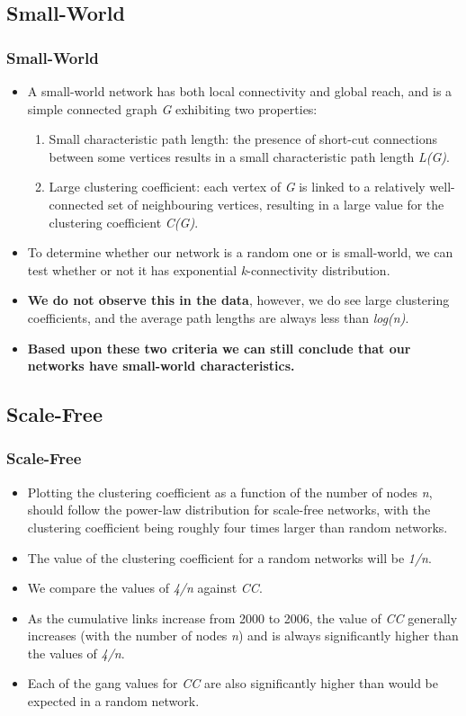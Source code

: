 \documentclass[pdftex]{beamer}
\begin{document}
\subsection{Small-World}

\begin{frame}
\frametitle{Small-World}
\begin{itemize}
\item A small-world network has both local connectivity and global reach, and is a simple connected graph {\emph{G}} exhibiting two properties:
\begin{enumerate}
\item Small characteristic path length: the presence of short-cut
  connections between some vertices results in a small characteristic
  path length {\emph{L(G)}}.
\item Large clustering coefficient: each vertex of {\emph{G}} is linked to a
  relatively well-connected set of neighbouring vertices, resulting in
  a large value for the clustering coefficient {\emph{C(G)}}.
\end{enumerate}
\pause
\item To determine whether our network is a random one or is
  small-world, we can test whether or not it has exponential
  {\emph{k}}-connectivity distribution.
\pause
\item {\textbf{We do not observe this in the data}}, however, we do see large
  clustering coefficients, and the average path lengths are always
  less than {\emph{log(n)}}. 
\item {\textbf{Based upon these two criteria we can still conclude that our
  networks have small-world characteristics.}}
\end{itemize}
\end{frame}

\subsection{Scale-Free}

\begin{frame}
\frametitle{Scale-Free}
\begin{itemize}
\item Plotting the clustering coefficient as a function of the number
  of nodes {\emph{n}}, should follow the power-law distribution for scale-free
  networks, with the clustering coefficient being roughly four times
  larger than random networks.
\item The value of the clustering coefficient for a random networks
  will be {\emph{1/n}}. 
\pause
\item We compare the values of {\emph{4/n}} against {\emph{CC}}.
\item  As the cumulative links increase from 2000 to 2006, the value
  of {\emph{CC}} generally increases (with the number of nodes {\emph{n}}) and is always
  significantly higher than the values of {\emph{4/n}}. 
\item Each of the gang values for {\emph{CC}} are also significantly higher
  than would be expected in a random network.
\end{itemize}
\end{frame}
\end{document}
